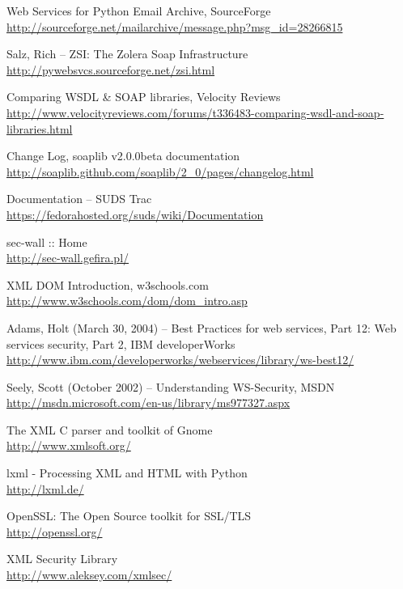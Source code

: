 \begin{thebibliography}{99}
Web Services for Python Email Archive, SourceForge\\
\url{http://sourceforge.net/mailarchive/message.php?msg_id=28266815}

Salz, Rich -- ZSI: The Zolera Soap Infrastructure\\
\url{http://pywebsvcs.sourceforge.net/zsi.html}

Comparing WSDL & SOAP libraries, Velocity Reviews\\
\url{http://www.velocityreviews.com/forums/t336483-comparing-wsdl-and-soap-libraries.html}

Change Log, soaplib v2.0.0beta documentation\\
\url{http://soaplib.github.com/soaplib/2_0/pages/changelog.html}

Documentation -- SUDS Trac\\
\url{https://fedorahosted.org/suds/wiki/Documentation}

sec-wall :: Home\\
\url{http://sec-wall.gefira.pl/}

XML DOM Introduction, w3schools.com\\
\url{http://www.w3schools.com/dom/dom_intro.asp}

Adams, Holt (March 30, 2004) -- Best Practices for web services, Part 12: Web services security, Part 2, IBM developerWorks\\
\url{http://www.ibm.com/developerworks/webservices/library/ws-best12/}

Seely, Scott (October 2002) -- Understanding WS-Security, MSDN\\
\url{http://msdn.microsoft.com/en-us/library/ms977327.aspx}

The XML C parser and toolkit of Gnome\\
\url{http://www.xmlsoft.org/}

lxml - Processing XML and HTML with Python\\
\url{http://lxml.de/}

OpenSSL: The Open Source toolkit for SSL/TLS\\
\url{http://openssl.org/}

XML Security Library\\
\url{http://www.aleksey.com/xmlsec/}


\end{thebibliography}
